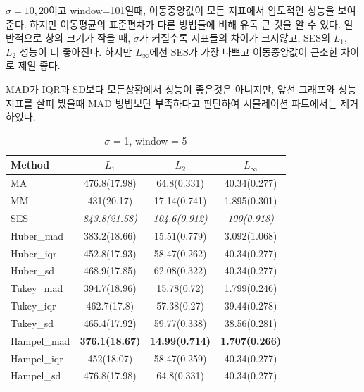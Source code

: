 \documentclass[letterpaper,12pt]{article}
\begin{document}
{$\sigma=10,20$이고 window=101일때, 이동중앙값이 모든 지표에서 압도적인 성능을 보여준다. 하지만 이동평균의 표준편차가 다른 방법들에 비해 유독 큰 것을 알 수 있다.
일반적으로 창의 크기가 작을 때, $\sigma$가 커질수록 지표들의 차이가 크지않고, SES의 $L_1$, $L_2$ 성능이 더 좋아진다. 하지만 $L_\infty$에선 SES가 가장 나쁘고 이동중앙값이 근소한 차이로 제일 좋다.

MAD가 IQR과 SD보다 모든상황에서 성능이 좋은것은 아니지만, 앞선 그래프와 성능지표를 살펴 봤을때 MAD 방법보단 부족하다고 판단하여 시뮬레이션 파트에서는 제거하였다.


\begin{table}[H]
\small
\centering
\caption{$\sigma$ = 1, window = 5}
\vspace{-2mm}
\label{tab:s1w5}
\begin{tabular}{lccc}
\toprule
Method      & $L_1$             & $L_2$             & $L_\infty$       \\
\midrule
MA          & 476.8(17.98)      & 64.8(0.331)       & 40.34(0.277)     \\
MM          & 431(20.17)        & 17.14(0.741)      & 1.895(0.301)     \\
SES         & \textit{843.8(21.58)} & \textit{104.6(0.912)} & \textit{100(0.918)} \\
Huber\_mad  & 383.2(18.66)      & 15.51(0.779)      & 3.092(1.068)     \\
Huber\_iqr  & 452.8(17.93)      & 58.47(0.262)      & 40.34(0.277)     \\
Huber\_sd   & 468.9(17.85)      & 62.08(0.322)      & 40.34(0.277)     \\
Tukey\_mad  & 394.7(18.96)      & 15.78(0.72)       & 1.799(0.246)     \\
Tukey\_iqr  & 462.7(17.8)       & 57.38(0.27)       & 39.44(0.278)     \\
Tukey\_sd   & 465.4(17.92)      & 59.77(0.338)      & 38.56(0.281)     \\
Hampel\_mad & \textbf{376.1(18.67)} & \textbf{14.99(0.714)} & \textbf{1.707(0.266)} \\
Hampel\_iqr & 452(18.07)        & 58.47(0.259)      & 40.34(0.277)     \\
Hampel\_sd  & 476.8(17.98)      & 64.8(0.331)       & 40.34(0.277)     \\
\bottomrule
\end{tabular}
\end{table}
\vspace{-6mm}

}
\end{document}
